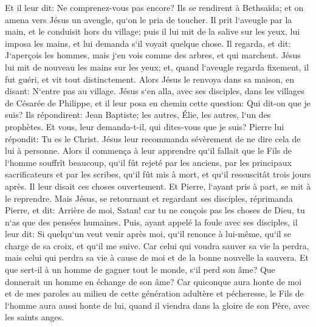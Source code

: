 \verse Et il leur dit: Ne comprenez-vous pas encore? 
\verse Ils se rendirent à Bethsaïda; et on amena vers Jésus un aveugle, qu`on le pria de toucher. 
\verse Il prit l`aveugle par la main, et le conduisit hors du village; puis il lui mit de la salive sur les yeux, lui imposa les mains, et lui demanda s`il voyait quelque chose. 
\verse Il regarda, et dit: J`aperçois les hommes, mais j`en vois comme des arbres, et qui marchent. 
\verse Jésus lui mit de nouveau les mains sur les yeux; et, quand l`aveugle regarda fixement, il fut guéri, et vit tout distinctement. 
\verse Alors Jésus le renvoya dans sa maison, en disant: N`entre pas au village. 
\verse Jésus s`en alla, avec ses disciples, dans les villages de Césarée de Philippe, et il leur posa en chemin cette question: Qui dit-on que je suis? 
\verse Ils répondirent: Jean Baptiste; les autres, Élie, les autres, l`un des prophètes. 
\verse Et vous, leur demanda-t-il, qui dites-vous que je suis? Pierre lui répondit: Tu es le Christ. 
\verse Jésus leur recommanda sévèrement de ne dire cela de lui à personne. 
\verse Alors il commença à leur apprendre qu`il fallait que le Fils de l`homme souffrît beaucoup, qu`il fût rejeté par les anciens, par les principaux sacrificateurs et par les scribes, qu`il fût mis à mort, et qu`il ressuscitât trois jours après. 
\verse Il leur disait ces choses ouvertement. Et Pierre, l`ayant pris à part, se mit à le reprendre. 
\verse Mais Jésus, se retournant et regardant ses disciples, réprimanda Pierre, et dit: Arrière de moi, Satan! car tu ne conçois pas les choses de Dieu, tu n`as que des pensées humaines. 
\verse Puis, ayant appelé la foule avec ses disciples, il leur dit: Si quelqu`un veut venir après moi, qu`il renonce à lui-même, qu`il se charge de sa croix, et qu`il me suive. 
\verse Car celui qui voudra sauver sa vie la perdra, mais celui qui perdra sa vie à cause de moi et de la bonne nouvelle la sauvera. 
\verse Et que sert-il à un homme de gagner tout le monde, s`il perd son âme? 
\verse Que donnerait un homme en échange de son âme? 
\verse Car quiconque aura honte de moi et de mes paroles au milieu de cette génération adultère et pécheresse, le Fils de l`homme aura aussi honte de lui, quand il viendra dans la gloire de son Père, avec les saints anges. 

